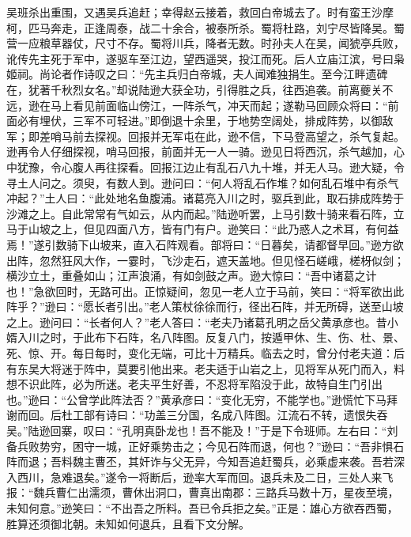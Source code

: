 吴班杀出重围，又遇吴兵追赶；幸得赵云接着，救回白帝城去了。时有蛮王沙摩柯，匹马奔走，正逢周泰，战二十余合，被泰所杀。蜀将杜路，刘宁尽皆降吴。蜀营一应粮草器仗，尺寸不存。蜀将川兵，降者无数。时孙夫人在吴，闻猇亭兵败，讹传先主死于军中，遂驱车至江边，望西遥哭，投江而死。后人立庙江滨，号曰枭姬祠。尚论者作诗叹之曰：“先主兵归白帝城，夫人闻难独捐生。至今江畔遗碑在，犹著千秋烈女名。”却说陆逊大获全功，引得胜之兵，往西追袭。前离夔关不远，逊在马上看见前面临山傍江，一阵杀气，冲天而起；遂勒马回顾众将曰：“前面必有埋伏，三军不可轻进。”即倒退十余里，于地势空阔处，排成阵势，以御敌军；即差哨马前去探视。回报并无军屯在此，逊不信，下马登高望之，杀气复起。逊再令人仔细探视，哨马回报，前面并无一人一骑。逊见日将西沉，杀气越加，心中犹豫，令心腹人再往探看。回报江边止有乱石八九十堆，并无人马。逊大疑，令寻土人问之。须臾，有数人到。逊问曰：“何人将乱石作堆？如何乱石堆中有杀气冲起？”土人曰：“此处地名鱼腹浦。诸葛亮入川之时，驱兵到此，取石排成阵势于沙滩之上。自此常常有气如云，从内而起。”陆逊听罢，上马引数十骑来看石阵，立马于山坡之上，但见四面八方，皆有门有户。逊笑曰：“此乃惑人之术耳，有何益焉！”遂引数骑下山坡来，直入石阵观看。部将曰：“日暮矣，请都督早回。”逊方欲出阵，忽然狂风大作，一霎时，飞沙走石，遮天盖地。但见怪石嵯峨，槎枒似剑；横沙立土，重叠如山；江声浪涌，有如剑鼓之声。逊大惊曰：“吾中诸葛之计也！”急欲回时，无路可出。正惊疑间，忽见一老人立于马前，笑曰：“将军欲出此阵乎？”逊曰：“愿长者引出。”老人策杖徐徐而行，径出石阵，并无所碍，送至山坡之上。逊问曰：“长者何人？”老人答曰：“老夫乃诸葛孔明之岳父黄承彦也。昔小婿入川之时，于此布下石阵，名八阵图。反复八门，按遁甲休、生、伤、杜、景、死、惊、开。每日每时，变化无端，可比十万精兵。临去之时，曾分付老夫道：后有东吴大将迷于阵中，莫要引他出来。老夫适于山岩之上，见将军从死门而入，料想不识此阵，必为所迷。老夫平生好善，不忍将军陷没于此，故特自生门引出也。”逊曰：“公曾学此阵法否？”黄承彦曰：“变化无穷，不能学也。”逊慌忙下马拜谢而回。后杜工部有诗曰：“功盖三分国，名成八阵图。江流石不转，遗恨失吞吴。”陆逊回寨，叹曰：“孔明真卧龙也！吾不能及！”于是下令班师。左右曰：“刘备兵败势穷，困守一城，正好乘势击之；今见石阵而退，何也？”逊曰：“吾非惧石阵而退；吾料魏主曹丕，其奸诈与父无异，今知吾追赶蜀兵，必乘虚来袭。吾若深入西川，急难退矣。”遂令一将断后，逊率大军而回。退兵未及二日，三处人来飞报：“魏兵曹仁出濡须，曹休出洞口，曹真出南郡：三路兵马数十万，星夜至境，未知何意。”逊笑曰：“不出吾之所料。吾已令兵拒之矣。”正是：雄心方欲吞西蜀，胜算还须御北朝。未知如何退兵，且看下文分解。
